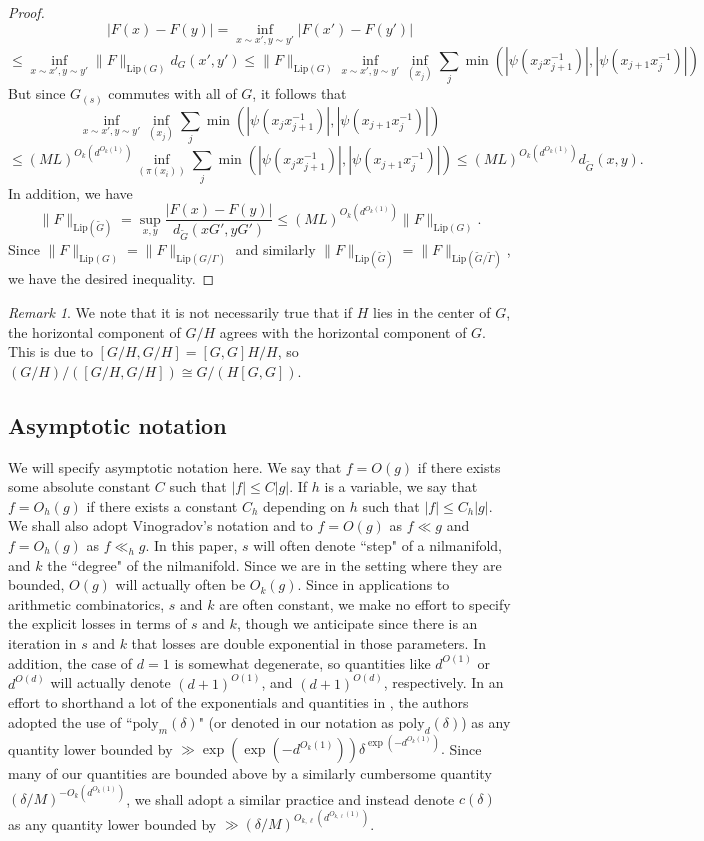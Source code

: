 \documentclass[11pt, a4paper]{amsart}
\theoremstyle{plain}
\theoremstyle{plain}
\theoremstyle{definition}
\theoremstyle{remark}
\newtheorem*{remark}{Remark}
\numberwithin{equation}{section}
\numberwithin{lemma}{section}
\numberwithin{proposition}{section}
\numberwithin{corollary}{section}
\numberwithin{definition}{section}
\numberwithin{claim}{section}
\begin{document}
\begin{proof}
$$|F(x) - F(y)| = \inf_{x \sim x', y \sim y'} |F(x') - F(y')| $$
$$\le \inf_{x \sim x', y \sim y'} \|F\|_{\mathrm{Lip}(G)}d_G(x', y') \le \|F\|_{\mathrm{Lip}(G)}\inf_{x \sim x', y \sim y'} \inf_{(x_j)} \sum_j \min(|\psi(x_j x_{j + 1}^{-1})|, |\psi(x_{j + 1}x_j^{-1})|)$$
But since $G_{(s)}$ commutes with all of $G$, it follows that
$$\inf_{x \sim x', y \sim y'} \inf_{(x_j)} \sum_j \min(|\psi(x_j x_{j + 1}^{-1})|, |\psi(x_{j + 1}x_j^{-1})|) $$
$$\le (ML)^{O_k(d^{O_k(1)})}\inf_{(\pi(x_i))} \sum_j \min(|\psi(x_j x_{j + 1}^{-1})|, |\psi(x_{j + 1}x_j^{-1})|) \le (ML)^{O_k(d^{O_k(1)})}d_{\tilde{G}}(x, y).$$
In addition, we have
$$\|F\|_{\mathrm{Lip}(\tilde{G})} = \sup_{x, y} \frac{|F(x) - F(y)|}{d_{\tilde{G}}(xG', yG')} \le (ML)^{O_k(d^{O_k(1)})}\|F\|_{\mathrm{Lip}(G)}.$$
Since $\|F\|_{\mathrm{Lip}(G)} = \|F\|_{\mathrm{Lip}(G/\Gamma)}$ and similarly $\|F\|_{\mathrm{Lip}(\tilde{G})} = \|F\|_{\mathrm{Lip}(\tilde{G}/\tilde{\Gamma})}$, we have the desired inequality.
\end{proof}
\begin{remark}
We note that it is not necessarily true that if $H$ lies in the center of $G$, the horizontal component of $G/H$ agrees with the horizontal component of $G$. This is due to $[G/H, G/H] = [G, G]H/H$, so $(G/H)/([G/H, G/H]) \cong G/(H[G, G])$.
\end{remark}
\subsection{Asymptotic notation}
We will specify asymptotic notation here. We say that $f = O(g)$ if there exists some absolute constant $C$ such that $|f| \le C|g|$. If $h$ is a variable, we say that $f = O_h(g)$ if there exists a constant $C_h$ depending on $h$ such that $|f| \le C_h|g|$. We shall also adopt Vinogradov's notation and to $f = O(g)$ as $f \ll g$ and $f = O_h(g)$ as $f \ll_h g$. In this paper, $s$ will often denote ``step" of a nilmanifold, and $k$ the ``degree" of the nilmanifold. Since we are in the setting where they are bounded, $O(g)$ will actually often be $O_k(g)$. Since in applications to arithmetic combinatorics, $s$ and $k$ are often constant, we make no effort to specify the explicit losses in terms of $s$ and $k$, though we anticipate since there is an iteration in $s$ and $k$ that losses are double exponential in those parameters. In addition, the case of $d = 1$ is somewhat degenerate, so quantities like $d^{O(1)}$ or $d^{O(d)}$ will actually denote $(d + 1)^{O(1)}$, and $(d + 1)^{O(d)}$, respectively. In an effort to shorthand a lot of the exponentials and quantities in \cite[Appendix A]{TT21}, the authors adopted the use of ``$\mathrm{poly}_m(\delta)$" (or denoted in our notation as $\mathrm{poly}_d(\delta)$) as any quantity lower bounded by $\gg \exp(\exp(-d^{O_k(1)}))\delta^{\exp(-d^{O_k(1)})}.$ Since many of our quantities are bounded above by a similarly cumbersome quantity $(\delta/M)^{-O_k(d^{O_k(1)})}$, we shall adopt a similar practice and instead denote $c(\delta)$ as any quantity lower bounded by $\gg (\delta/M)^{O_{k, \ell}(d^{O_{k, \ell}(1)})}$.
\end{document}
